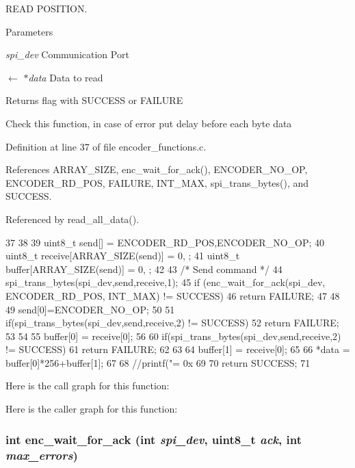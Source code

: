 READ POSITION. 


\begin{DoxyParams}{Parameters}
\item[{\em spi\_\-dev}]Communication Port \item[\mbox{$\leftarrow$} {\em $\ast$data}]Data to read \end{DoxyParams}
\begin{DoxyReturn}{Returns}
flag with SUCCESS or FAILURE 
\end{DoxyReturn}


Check this function, in case of error put delay before each byte data



Definition at line 37 of file encoder\_\-functions.c.



References ARRAY\_\-SIZE, enc\_\-wait\_\-for\_\-ack(), ENCODER\_\-NO\_\-OP, ENCODER\_\-RD\_\-POS, FAILURE, INT\_\-MAX, spi\_\-trans\_\-bytes(), and SUCCESS.



Referenced by read\_\-all\_\-data().




\begin{DoxyCode}
37                                                       {
38 
39     uint8_t send[] = {ENCODER_RD_POS,ENCODER_NO_OP};
40     uint8_t receive[ARRAY_SIZE(send)] = {0, };
41     uint8_t buffer[ARRAY_SIZE(send)] = {0, } ;
42     
43     /* Send command */
44     spi_trans_bytes(spi_dev,send,receive,1);
45     if (enc_wait_for_ack(spi_dev, ENCODER_RD_POS, INT_MAX) != SUCCESS) { 
46         return FAILURE; 
47     }
48 
49     send[0]=ENCODER_NO_OP;
50 
51     if(spi_trans_bytes(spi_dev,send,receive,2) != SUCCESS) { 
52         return FAILURE; 
53     }
54 
55     buffer[0] = receive[0];
56 
60     if(spi_trans_bytes(spi_dev,send,receive,2) != SUCCESS) { 
61         return FAILURE; 
62     }
63 
64     buffer[1] = receive[0];
65 
66     *data = buffer[0]*256+buffer[1];
67 
68     //printf("\nreceive = 0x %
69 
70    return SUCCESS;
71 }
\end{DoxyCode}




Here is the call graph for this function:



Here is the caller graph for this function:

\hypertarget{group__enc_gad82fb44f2e735628ec95e003e4a1f93c}{
\subsubsection[{enc\_\-wait\_\-for\_\-ack}]{\setlength{\rightskip}{0pt plus 5cm}int enc\_\-wait\_\-for\_\-ack (int {\em spi\_\-dev}, \/  uint8\_\-t {\em ack}, \/  int {\em max\_\-errors})}}
\label{group__enc_gad82fb44f2e735628ec95e003e4a1f93c}



